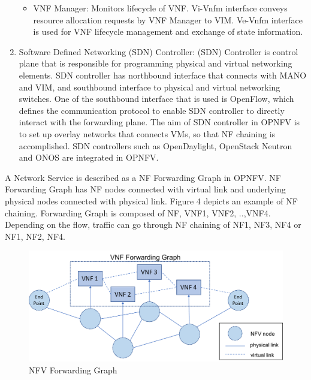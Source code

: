 \begin{enumerate}
\begin{itemize}
			\item VNF Manager: Monitors lifecycle of VNF. Vi-Vnfm interface conveys resource allocation requests by VNF Manager to VIM. Ve-Vnfm interface is used for VNF lifecycle management and exchange of state information. 
		\end{itemize}
	\item Software Defined Networking (SDN) Controller: (SDN) Controller is control plane that is responsible for programming physical and virtual networking elements. SDN controller has northbound interface that connects with MANO and VIM, and southbound interface to physical and virtual networking switches. One of the southbound interface that is used is OpenFlow, which defines the communication protocol to enable SDN controller to directly interact with the forwarding plane. 
The aim of SDN controller in OPNFV is to set up overlay networks that connects VMs, so that NF chaining is accomplished. SDN controllers such as OpenDaylight\cite{OpenDaylight}, OpenStack Neutron and ONOS are integrated in OPNFV.
\end{enumerate}

A Network Service is described as a NF Forwarding Graph in OPNFV. NF Forwarding Graph has NF nodes connected with virtual link and underlying physical nodes connected with physical link. Figure 4 depicts an example of NF chaining. Forwarding Graph is composed of NF, VNF1, VNF2, ..,VNF4. Depending on the flow, traffic can go through NF chaining of NF1, NF3, NF4 or NF1, NF2, NF4. 
\begin{figure}
	\centering
	\includegraphics[width=120mm]{pics/NFV_FG.pdf}
	\caption{NFV Forwarding Graph}
	\label{fig: OPNFV_FG}
\end{figure}

